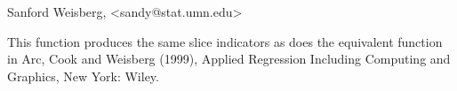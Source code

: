 \begin{Author}\relax
Sanford Weisberg, <sandy@stat.umn.edu>
\end{Author}
\begin{References}\relax
This function produces the same slice indicators as does the
equivalent function in Arc, Cook and Weisberg (1999), Applied Regression Including
Computing and Graphics, New York:  Wiley.
\end{References}
\begin{SeeAlso}\relax
{}
\end{SeeAlso}

